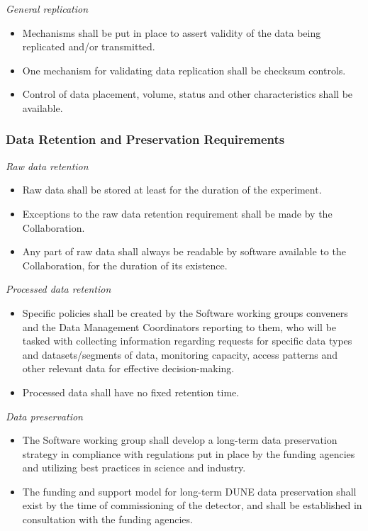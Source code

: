 \noindent
\textit{General replication}

\begin{itemize}
\item Mechanisms shall be put in place to assert validity of the data being replicated and/or transmitted.

\item One mechanism for validating data replication shall be checksum controls.

\item Control of data placement, volume, status and other characteristics shall be available.
\end{itemize}

\subsubsection{Data Retention and Preservation Requirements}
\label{sec:req-raw-data-retention}
\textit{Raw data retention}
\begin{itemize}
\item Raw data shall be stored at least for the duration of the experiment.

\item Exceptions to the raw data retention requirement shall be made by the Collaboration.

\item Any part of raw data shall always be readable by software available to the Collaboration, for the duration of its existence.

\end{itemize}
\noindent
\textit{Processed data retention}
\begin{itemize}
\item Specific policies shall be created by the Software working groups conveners and the
Data Management Coordinators reporting to them, who will be tasked with collecting information
regarding requests for specific data types and datasets/segments of data, monitoring capacity,
access patterns and other relevant data for effective decision-making. 

\item Processed data shall have no fixed retention time.
\end{itemize}
\noindent
\textit{Data preservation}
\label{sec:dunepres}
\begin{itemize}
\item The Software working group shall develop a long-term data preservation strategy in compliance with regulations put in place by the funding agencies and utilizing best practices in science and industry.

\item The funding and support model for long-term DUNE data preservation shall exist by the time of commissioning of the detector, and shall be established in consultation with the funding agencies.
\end{itemize}

